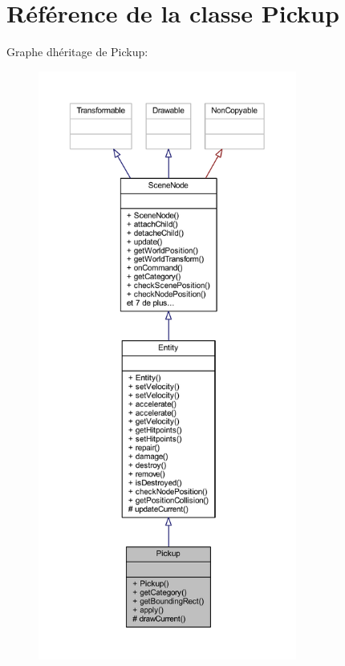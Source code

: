 \hypertarget{class_pickup}{}\section{Référence de la classe Pickup}
\label{class_pickup}


Graphe d\textquotesingle{}héritage de Pickup\+:\nopagebreak
\begin{figure}[H]
\begin{center}
\leavevmode
\includegraphics[height=550pt]{class_pickup__inherit__graph}
\end{center}
\end{figure}


